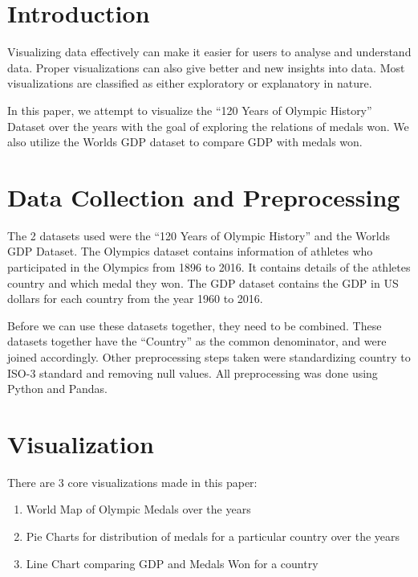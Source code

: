 \documentclass[a4paper, 10pt]{article}
\begin{document}
\section{Introduction}

Visualizing data effectively can make it easier for users to analyse and understand data. Proper visualizations can also give better and new insights into data. Most visualizations are classified as either exploratory or explanatory in nature.

In this paper, we attempt to visualize the ``120 Years of Olympic History'' \cite{olympicDataset} Dataset over the years with the goal of exploring the relations of medals won. We also utilize the Worlds GDP dataset \cite{gdpDataset} to compare GDP with medals won. 

\section{Data Collection and Preprocessing}

The 2 datasets used were the ``120 Years of Olympic History'' and the Worlds GDP Dataset. The Olympics dataset contains information of athletes who participated in the Olympics from 1896 to 2016. It contains details of the athletes country and which medal they won. The GDP dataset contains the GDP in US dollars for each country from the year 1960 to 2016.

Before we can use these datasets together, they need to be combined. These datasets together have the ``Country'' as the common denominator, and were joined accordingly. Other preprocessing steps taken were standardizing country to ISO-3 standard and removing null values. All preprocessing was done using Python and Pandas.

\section{Visualization}

There are 3 core visualizations made in this paper:

\begin{enumerate}
	\item World Map of Olympic Medals over the years
	\item Pie Charts for distribution of medals for a particular country over the years
	\item Line Chart comparing GDP and Medals Won for a country
\end{enumerate}
\end{document}
